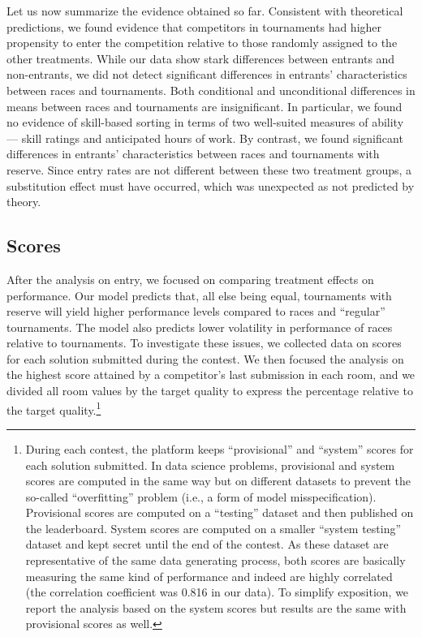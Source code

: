 \documentclass[11pt, titlepage]{article}
\begin{document}
Let us now summarize the evidence obtained so far. Consistent with
theoretical predictions, we found evidence that competitors in
tournaments had higher propensity to enter the competition relative to
those randomly assigned to the other treatments. While our data show
stark differences between entrants and non-entrants, we did not detect
significant differences in entrants' characteristics between races and
tournaments. Both conditional and unconditional differences in means
between races and tournaments are insignificant. In particular, we found
no evidence of skill-based sorting in terms of two well-suited measures
of ability --- skill ratings and anticipated hours of work. By contrast,
we found significant differences in entrants' characteristics between
races and tournaments with reserve. Since entry rates are not different
between these two treatment groups, a substitution effect must have
occurred, which was unexpected as not predicted by theory.

\subsection{Scores}\label{scores}

After the analysis on entry, we focused on comparing treatment effects
on performance. Our model predicts that, all else being equal,
tournaments with reserve will yield higher performance levels compared
to races and ``regular'' tournaments. The model also predicts lower
volatility in performance of races relative to tournaments. To
investigate these issues, we collected data on scores for each solution
submitted during the contest. We then focused the analysis on the
highest score attained by a competitor's last submission in each room,
and we divided all room values by the target quality to express the
percentage relative to the target quality.\footnote{During each contest,
  the platform keeps ``provisional'' and ``system'' scores for each
  solution submitted. In data science problems, provisional and system
  scores are computed in the same way but on different datasets to
  prevent the so-called ``overfitting'' problem (i.e., a form of model
  misspecification). Provisional scores are computed on a ``testing''
  dataset and then published on the leaderboard. System scores are
  computed on a smaller ``system testing'' dataset and kept secret until
  the end of the contest. As these dataset are representative of the
  same data generating process, both scores are basically measuring the
  same kind of performance and indeed are highly correlated (the
  correlation coefficient was 0.816 in our data). To simplify
  exposition, we report the analysis based on the system scores but
  results are the same with provisional scores as well.}
\end{document}
